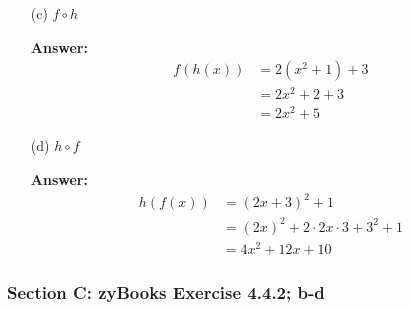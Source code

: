 \documentclass[14pt]{extreport}
\newcommand{\answer}[0]{\medskip \textbf{Answer:} \medskip}
\begin{document}
\begin{enumerate}
    \item[(c)] $f \circ h$
    
        \answer
        \begin{align*}
            f(h(x)) &= 2(x^2+1)+3\\
                    &= 2x^2 +2+3\\
                    &=2x^2+5
        \end{align*}
        
    \item[(d)] $h \circ f$
        
        \answer
        \begin{align*}
            h(f(x)) &= (2x+3)^2 +1\\
                    &= (2x)^2 +2 \cdot 2x \cdot 3 + 3^2 +1\\
                    &= 4x^2 + 12 x + 10
        \end{align*}
        
\end{enumerate}

\subsubsection*{Section C: zyBooks Exercise 4.4.2; b-d}
\end{document}
